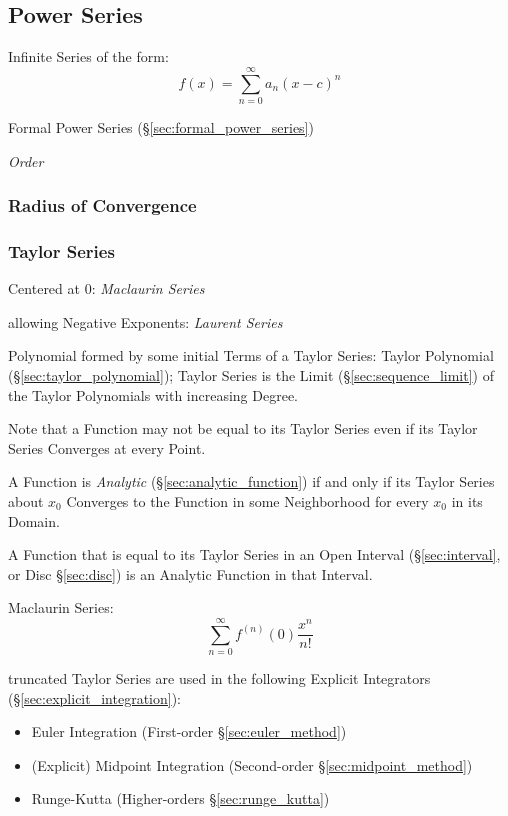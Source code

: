 \subsection{Power Series}\label{sec:power_series}

Infinite Series of the form:
\[
  f(x) = \sum_{n=0}^\infty a_n (x - c)^n
\]

\fist Formal Power Series (\S\ref{sec:formal_power_series})

\emph{Order}



\subsubsection{Radius of Convergence}\label{sec:radius_of_convergence}

\subsubsection{Taylor Series}\label{sec:taylor_series}

Centered at $0$: \emph{Maclaurin Series}

allowing Negative Exponents: \emph{Laurent Series}

Polynomial formed by some initial Terms of a Taylor Series: Taylor
Polynomial (\S\ref{sec:taylor_polynomial}); Taylor Series is the Limit
(\S\ref{sec:sequence_limit}) of the Taylor Polynomials with increasing
Degree.

Note that a Function may not be equal to its Taylor Series even if its
Taylor Series Converges at every Point.

A Function is \emph{Analytic} (\S\ref{sec:analytic_function}) if and only if
its Taylor Series about $x_0$ Converges to the Function in some Neighborhood
for every $x_0$ in its Domain.

A Function that is equal to its Taylor Series in an Open Interval
(\S\ref{sec:interval}, or Disc \S\ref{sec:disc}) is an Analytic Function in
that Interval.

Maclaurin Series:
\[
  \sum_{n=0}^\infty f^{(n)}(0) \frac{x^n}{n!}
\]

truncated Taylor Series are used in the following Explicit Integrators
(\S\ref{sec:explicit_integration}):
\begin{itemize}
  \item Euler Integration (First-order \S\ref{sec:euler_method})
  \item (Explicit) Midpoint Integration (Second-order
    \S\ref{sec:midpoint_method})
  \item Runge-Kutta (Higher-orders \S\ref{sec:runge_kutta})
\end{itemize}



